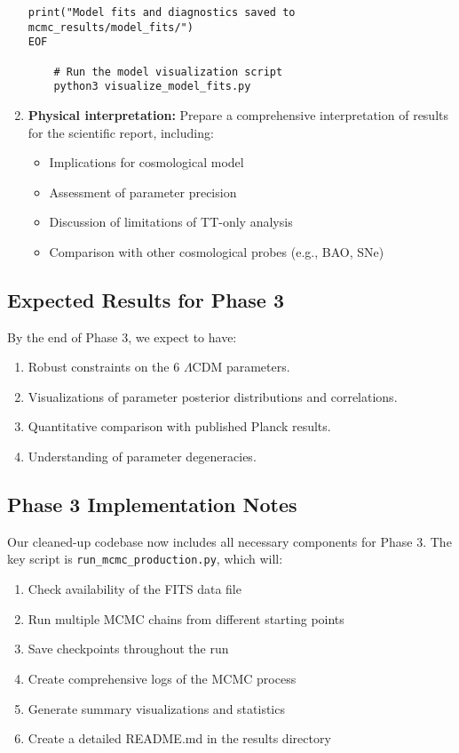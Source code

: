 \documentclass[11pt]{article}
\begin{document}
\begin{enumerate}
\begin{lstlisting}[basicstyle=\small\ttfamily]
print("Model fits and diagnostics saved to mcmc_results/model_fits/")
EOF

    # Run the model visualization script
    python3 visualize_model_fits.py
    \end{lstlisting}
    
    \item \textbf{Physical interpretation:} Prepare a comprehensive interpretation of results for the scientific report, including:
    \begin{itemize}
        \item Implications for cosmological model
        \item Assessment of parameter precision
        \item Discussion of limitations of TT-only analysis
        \item Comparison with other cosmological probes (e.g., BAO, SNe)
    \end{itemize}
\end{enumerate}

\subsection{Expected Results for Phase 3}

By the end of Phase 3, we expect to have:

\begin{enumerate}
    \item Robust constraints on the 6 $\Lambda$CDM parameters.
    \item Visualizations of parameter posterior distributions and correlations.
    \item Quantitative comparison with published Planck results.
    \item Understanding of parameter degeneracies.
\end{enumerate}

\subsection{Phase 3 Implementation Notes}

Our cleaned-up codebase now includes all necessary components for Phase 3. The key script is \texttt{run\_mcmc\_production.py}, which will:

\begin{enumerate}
    \item Check availability of the FITS data file
    \item Run multiple MCMC chains from different starting points
    \item Save checkpoints throughout the run
    \item Create comprehensive logs of the MCMC process
    \item Generate summary visualizations and statistics
    \item Create a detailed README.md in the results directory
\end{enumerate}
\end{document}
